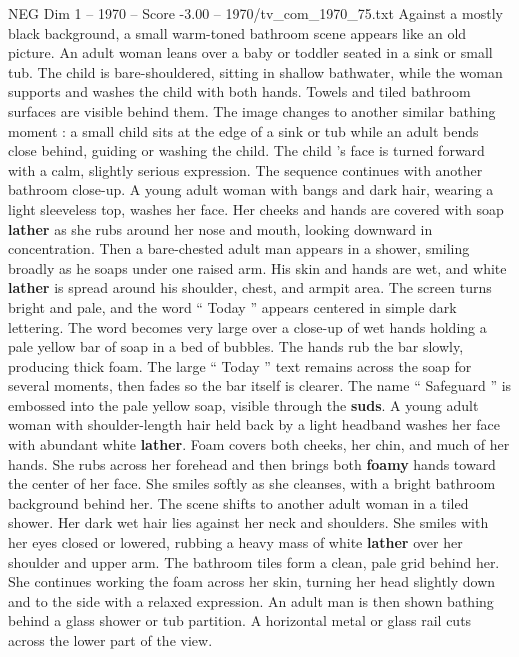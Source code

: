 \begin{textsample}{NEG Dim 1 – 1970 – Score -3.00 – 1970/tv\_com\_1970\_75.txt}  \label{ex:f1_neg_031}
Against a mostly black background, a small warm-toned bathroom scene appears like an old picture.
An adult woman leans over a baby or toddler seated in a sink or small tub.
The child is bare-shouldered, sitting in shallow bathwater, while the woman supports and washes the child with both hands.
Towels and tiled bathroom surfaces are visible behind them.
The image changes to another similar bathing moment : a small child sits at the edge of a sink or tub while an adult bends close behind, guiding or washing the child.
The child ’s face is turned forward with a calm, slightly serious expression.
The sequence continues with another bathroom close-up.
A young adult woman with bangs and dark hair, wearing a light sleeveless top, washes her face.
Her cheeks and hands are covered with soap \textbf{lather} as she rubs around her nose and mouth, looking downward in concentration.
Then a bare-chested adult man appears in a shower, smiling broadly as he soaps under one raised arm.
His skin and hands are wet, and white \textbf{lather} is spread around his shoulder, chest, and armpit area.
The screen turns bright and pale, and the word “ Today ” appears centered in simple dark lettering.
The word becomes very large over a close-up of wet hands holding a pale yellow bar of soap in a bed of bubbles.
The hands rub the bar slowly, producing thick foam.
The large “ Today ” text remains across the soap for several moments, then fades so the bar itself is clearer.
The name “ Safeguard ” is embossed into the pale yellow soap, visible through the \textbf{suds}.
A young adult woman with shoulder-length hair held back by a light headband washes her face with abundant white \textbf{lather}.
Foam covers both cheeks, her chin, and much of her hands.
She rubs across her forehead and then brings both \textbf{foamy} hands toward the center of her face.
She smiles softly as she cleanses, with a bright bathroom background behind her.
The scene shifts to another adult woman in a tiled shower.
Her dark wet hair lies against her neck and shoulders.
She smiles with her eyes closed or lowered, rubbing a heavy mass of white \textbf{lather} over her shoulder and upper arm.
The bathroom tiles form a clean, pale grid behind her.
She continues working the foam across her skin, turning her head slightly down and to the side with a relaxed expression.
An adult man is then shown bathing behind a glass shower or tub partition.
A horizontal metal or glass rail cuts across the lower part of the view.

\end{textsample}

